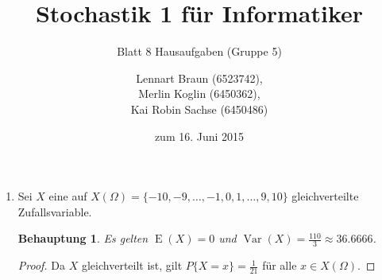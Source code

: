 \documentclass[a4paper]{scrartcl}
\title{Stochastik 1 für Informatiker}
\subtitle{Blatt 8 Hausaufgaben (Gruppe 5)}
\author{
    Lennart Braun (6523742), \\
    Merlin Koglin (6450362), \\
    Kai Robin Sachse (6450486)
}
\date{zum 16. Juni 2015}
\newtheorem*{behaupt}{Behauptung}
\newcommand{\e}{\operatorname{E}}
\newcommand{\var}{\operatorname{Var}}
\begin{document}
\maketitle

\begin{enumerate}[label=\bfseries\arabic*.]
    \item
        Sei $X$ eine auf
        $X(\Omega) = \{-10, -9, \ldots, -1, 0, 1, \ldots, 9, 10\}$
        gleichverteilte Zufallsvariable.
        \begin{behaupt}
            Es gelten $\e(X) = 0$ und
            $\var(X) = \frac{110}{3} \approx \num{36,6666}$.
        \end{behaupt}
        \begin{proof}
            Da $X$ gleichverteilt ist, gilt $P\{X = x\} = \frac{1}{21}$ für alle
            $x \in X(\Omega)$.


\end{proof}
\end{enumerate}
\end{document}
